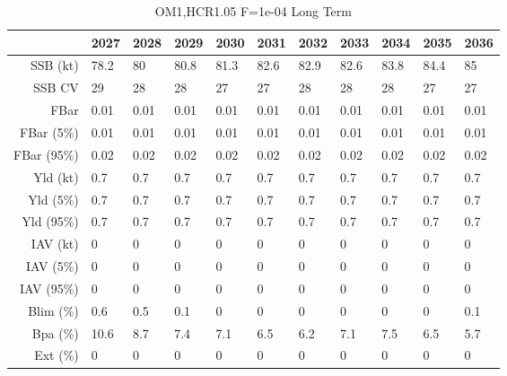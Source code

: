\begin{table}[ht]
\centering
\begin{tabular}{rllllllllll}
  \hline
 & 2027 & 2028 & 2029 & 2030 & 2031 & 2032 & 2033 & 2034 & 2035 & 2036 \\ 
  \hline
SSB (kt) & 78.2 & 80 & 80.8 & 81.3 & 82.6 & 82.9 & 82.6 & 83.8 & 84.4 & 85 \\ 
  SSB CV & 29 & 28 & 28 & 27 & 27 & 28 & 28 & 28 & 27 & 27 \\ 
   \hline
FBar & 0.01 & 0.01 & 0.01 & 0.01 & 0.01 & 0.01 & 0.01 & 0.01 & 0.01 & 0.01 \\ 
  FBar (5\%) & 0.01 & 0.01 & 0.01 & 0.01 & 0.01 & 0.01 & 0.01 & 0.01 & 0.01 & 0.01 \\ 
  FBar (95\%) & 0.02 & 0.02 & 0.02 & 0.02 & 0.02 & 0.02 & 0.02 & 0.02 & 0.02 & 0.02 \\ 
   \hline
Yld (kt) & 0.7 & 0.7 & 0.7 & 0.7 & 0.7 & 0.7 & 0.7 & 0.7 & 0.7 & 0.7 \\ 
  Yld (5\%) & 0.7 & 0.7 & 0.7 & 0.7 & 0.7 & 0.7 & 0.7 & 0.7 & 0.7 & 0.7 \\ 
  Yld (95\%) & 0.7 & 0.7 & 0.7 & 0.7 & 0.7 & 0.7 & 0.7 & 0.7 & 0.7 & 0.7 \\ 
   \hline
IAV (kt) & 0 & 0 & 0 & 0 & 0 & 0 & 0 & 0 & 0 & 0 \\ 
  IAV (5\%) & 0 & 0 & 0 & 0 & 0 & 0 & 0 & 0 & 0 & 0 \\ 
  IAV (95\%) & 0 & 0 & 0 & 0 & 0 & 0 & 0 & 0 & 0 & 0 \\ 
   \hline
Blim (\%) & \cellcolor{green}0.6 & \cellcolor{green}0.5 & \cellcolor{green}0.1 & \cellcolor{green}0 & \cellcolor{green}0 & \cellcolor{green}0 & \cellcolor{green}0 & \cellcolor{green}0 & \cellcolor{green}0 & \cellcolor{green}0.1 \\ 
  Bpa (\%) & 10.6 & 8.7 & 7.4 & 7.1 & 6.5 & 6.2 & 7.1 & 7.5 & 6.5 & 5.7 \\ 
  Ext (\%) & 0 & 0 & 0 & 0 & 0 & 0 & 0 & 0 & 0 & 0 \\ 
   \hline
\end{tabular}
\caption{OM1,HCR1.05 F=1e-04 Long Term} 
\end{table}

